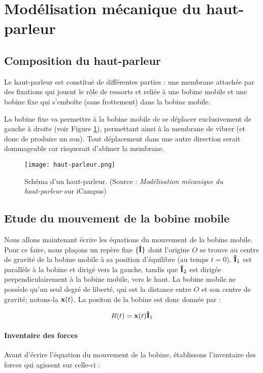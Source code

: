 

\section{Modélisation mécanique du haut-parleur}

\subsection{Composition du haut-parleur}
Le haut-parleur est constitué de différentes parties : une membrane
attachée par des fixations qui jouent le rôle de ressorts et reliée à 
une bobine mobile et une bobine fixe qui s'emboîte (sans frottement) 
dans la bobine mobile.

La bobine fixe va permettre à la bobine mobile de se déplacer exclusivement de gauche
à droite (voir Figure \ref{hp-scheme}), permettant ainsi à la membrane de vibrer 
(et donc de produire un son). Tout déplacement dans une autre direction serait dommageable
car risquerait d'abîmer la membrane.

\begin{figure}[ht!]
	\centering
	\texttt{[image: haut-parleur.png]}
	\caption{Schéma d'un haut-parleur. (Source : \textit{Modélisation mécanique du haut-parleur} sur iCampus)}
	\label{hp-scheme}
\end{figure}

\subsection{Etude du mouvement de la bobine mobile}
Nous allons maintenant écrire les équations du mouvement de la bobine mobile.
Pour ce faire, nous plaçons un repère fixe $\{{\bf\hat{I}}\}$ dont l'origine $O$ se trouve
au centre de gravité de la bobine mobile à sa position d'équilibre (au 
temps $t=0$). ${\bf\hat{ I}}_1$ est parallèle à la bobine et dirigé vers la gauche, tandis que
${\bf\hat{ I}}_2$ est dirigée perpendiculairement à la bobine mobile, vers le haut.
La bobine mobile ne possède qu'un seul degré de liberté, qui
est la distance entre $O$ et son centre de gravité; notons-la ${\bf x}(t)$.
La positon de la bobine est donc donnée par :

$$R(t) = {\bf x}(t) {\bf\hat{ I}}_1$$ 

\paragraph{Inventaire des forces}
Avant d'écrire l'équation du mouvement de la bobine, établissons l'inventaire
des forces qui agissent sur celle-ci :


